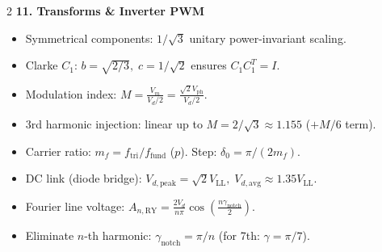 \begin{multicols}{2}
\textbf{11. Transforms \& Inverter PWM}
\vspace{-0.3em}
\begin{itemize}\setlength{\itemsep}{0pt}\setlength{\parskip}{0pt}
  \item Symmetrical components: $1/\sqrt{3}$ unitary power-invariant scaling.
  \item Clarke $C_1$: $b = \sqrt{2/3},\; c = 1/\sqrt{2}$ ensures $C_1 C_1^T = I$.
  \item Modulation index: $M = \frac{V_m}{V_d/2} = \frac{\sqrt{2}V_{\mathrm{ph}}}{V_d/2}$.
  \item 3rd harmonic injection: linear up to $M = 2/\sqrt{3} \approx 1.155$ ($+M/6$ term).
  \item Carrier ratio: $m_f = f_{\mathrm{tri}}/f_{\mathrm{fund}}$ ($p$). Step: $\delta_0 = \pi/(2m_f)$.
  \item DC link (diode bridge): $V_{d,\mathrm{peak}} = \sqrt{2}V_{\mathrm{LL}},\; V_{d,\mathrm{avg}} \approx 1.35 V_{\mathrm{LL}}$.
  \item Fourier line voltage: $A_{n,\mathrm{RY}} = \frac{2 V_d}{n\pi}\cos(\frac{n\gamma_{\mathrm{notch}}}{2})$.
  \item Eliminate $n$-th harmonic: $\gamma_{\mathrm{notch}} = \pi/n$ (for 7th: $\gamma = \pi/7$).
\end{itemize}

\end{multicols}
\clearpage
\restoregeometry
